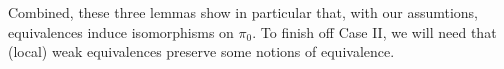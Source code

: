 \documentclass[a4paper,10pt
,draft
]{article}%
\newcommand{\J}{\mathbb J}
\renewcommand{\1}{\eta}%
\begin{document}

Combined, these three lemmas show in particular that, with our assumtions, equivalences induce isomorphisms on $\pi_0$.
%
To finish off Case II, we will need that (local) weak equivalences preserve some notions of equivalence.
\end{document}
